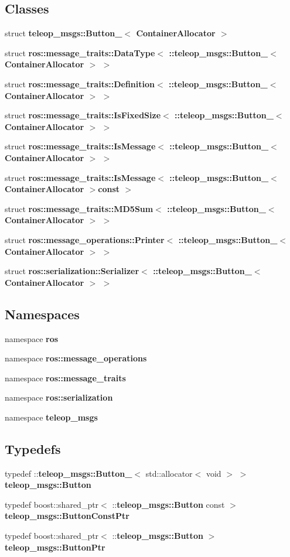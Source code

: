 \subsection*{Classes}
\begin{DoxyCompactItemize}
\item 
struct {\bf teleop\_\-msgs::Button\_\-$<$ ContainerAllocator $>$}
\item 
struct {\bf ros::message\_\-traits::DataType$<$ ::teleop\_\-msgs::Button\_\-$<$ ContainerAllocator $>$ $>$}
\item 
struct {\bf ros::message\_\-traits::Definition$<$ ::teleop\_\-msgs::Button\_\-$<$ ContainerAllocator $>$ $>$}
\item 
struct {\bf ros::message\_\-traits::IsFixedSize$<$ ::teleop\_\-msgs::Button\_\-$<$ ContainerAllocator $>$ $>$}
\item 
struct {\bf ros::message\_\-traits::IsMessage$<$ ::teleop\_\-msgs::Button\_\-$<$ ContainerAllocator $>$ $>$}
\item 
struct {\bf ros::message\_\-traits::IsMessage$<$ ::teleop\_\-msgs::Button\_\-$<$ ContainerAllocator $>$const  $>$}
\item 
struct {\bf ros::message\_\-traits::MD5Sum$<$ ::teleop\_\-msgs::Button\_\-$<$ ContainerAllocator $>$ $>$}
\item 
struct {\bf ros::message\_\-operations::Printer$<$ ::teleop\_\-msgs::Button\_\-$<$ ContainerAllocator $>$ $>$}
\item 
struct {\bf ros::serialization::Serializer$<$ ::teleop\_\-msgs::Button\_\-$<$ ContainerAllocator $>$ $>$}
\end{DoxyCompactItemize}
\subsection*{Namespaces}
\begin{DoxyCompactItemize}
\item 
namespace {\bf ros}
\item 
namespace {\bf ros::message\_\-operations}
\item 
namespace {\bf ros::message\_\-traits}
\item 
namespace {\bf ros::serialization}
\item 
namespace {\bf teleop\_\-msgs}
\end{DoxyCompactItemize}
\subsection*{Typedefs}
\begin{DoxyCompactItemize}
\item 
typedef ::{\bf teleop\_\-msgs::Button\_\-}$<$ std::allocator$<$ void $>$ $>$ {\bf teleop\_\-msgs::Button}
\item 
typedef boost::shared\_\-ptr$<$ ::{\bf teleop\_\-msgs::Button} const  $>$ {\bf teleop\_\-msgs::ButtonConstPtr}
\item 
typedef boost::shared\_\-ptr$<$ ::{\bf teleop\_\-msgs::Button} $>$ {\bf teleop\_\-msgs::ButtonPtr}
\end{DoxyCompactItemize}
